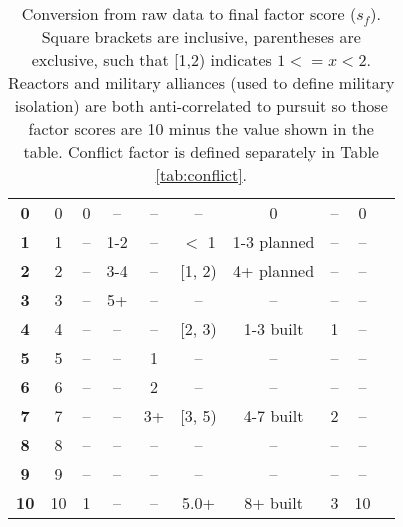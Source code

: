 \begin{table}
\begin{tabular}{|c|c|c|c|c|c|c|c|c|c|}
\hline
\textbf{0}      &  0                     &  0                   &  --                        &  --                     &  --                 &   0                   &    --         &  0           \\   
\textbf{1}      &  1                     &  --                  &  1-2                       &  --                     &  $<$ 1              &   1-3 planned         &    --         &  --          \\
\textbf{2}      &  2                     &  --                  &  3-4                       &  --                     &  [1, 2)             &   4+ planned          &    --         &  --          \\
\textbf{3}      &  3                     &  --                  &  5+                        &  --                     &  --                 &    --                 &    --         &  --          \\
\textbf{4}      &  4                     &  --                  &  --                        &  --                     &  [2, 3)             &    1-3 built          &     1         &  --          \\
\textbf{5}      &  5                     &  --                  &  --                        &  1                      &  --                 &       --              &    --         &  --          \\
\textbf{6}      &  6                     &  --                  &  --                        &  2                      &  --                 &       --              &    --         &  --          \\
\textbf{7}      &  7                     &  --                  &  --                        &  3+                     &  [3, 5)             &    4-7 built          &     2         &  --          \\
\textbf{8}      &  8                     &  --                  &  --                        &  --                     &  --                 &       --              &    --         &  --          \\
\textbf{9}      &  9                     &  --                  &  --                        &  --                     &  --                 &       --              &    --         &  --          \\
\textbf{10}     &  10                    &  1                   &  --                        &  --                     &   5.0+              &    8+ built           &     3         &  10          \\

\hline
\end{tabular}
\caption{Conversion from raw data to final factor score ($s_{f}$). Square brackets are inclusive, parentheses are exclusive, such that [1,2) indicates $1<=x<2$. Reactors and military alliances (used to define military isolation) are both anti-correlated to pursuit so those factor scores are 10 minus the value shown in the table. Conflict factor is defined separately in Table \ref{tab:conflict}. }
\label{tab:factor_conversions}
\end{table}


